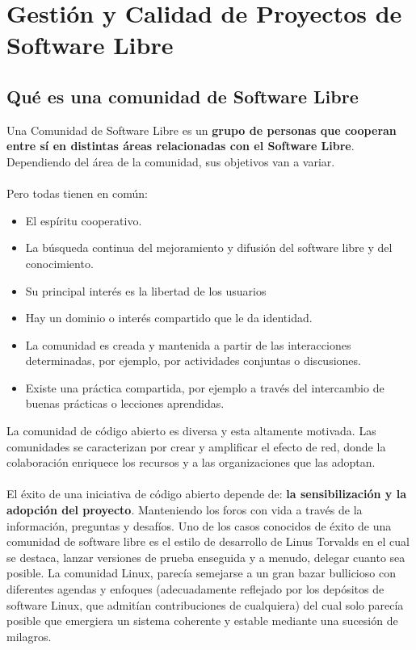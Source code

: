 \chapter{Gestión y Calidad de Proyectos de Software Libre}

\section{Qué es una comunidad de Software Libre}

Una Comunidad de Software Libre es un {\bf grupo de personas que cooperan entre sí en distintas áreas relacionadas con el Software Libre}. Dependiendo del área de la comunidad, sus objetivos van a variar.
\\
\\
Pero todas tienen en común:
\begin{itemize}
     \item El espíritu cooperativo. 
     \item La búsqueda continua del mejoramiento y difusión del software libre y del conocimiento.
     \item Su principal interés es la libertad de los usuarios
     \item Hay un dominio o interés compartido que le da identidad.
     \item La comunidad es creada y mantenida a partir de las interacciones determinadas, por ejemplo, por actividades conjuntas o discusiones.
     \item Existe una práctica compartida, por ejemplo a través del intercambio de buenas prácticas o lecciones aprendidas.
\end{itemize}

La comunidad de código abierto es diversa y esta altamente motivada. Las comunidades se caracterizan por crear y amplificar el efecto de red, donde la colaboración enriquece los recursos y a las organizaciones que las adoptan.
\\
\\
El éxito de una iniciativa de código abierto depende de: {\bf la sensibilización y la adopción del proyecto}. Manteniendo los foros con vida a través de la información, preguntas y desafíos.
Uno de los casos conocidos de éxito de una comunidad de software libre es el estilo de desarrollo de Linus Torvalds en el cual se destaca, lanzar versiones de prueba enseguida y a menudo, delegar cuanto sea posible. La comunidad Linux, parecía semejarse a un gran bazar bullicioso con diferentes agendas y enfoques (adecuadamente reflejado por los depósitos de software Linux, que admitían contribuciones de cualquiera) del cual solo parecía posible que emergiera un sistema coherente y estable mediante una sucesión de milagros. 

